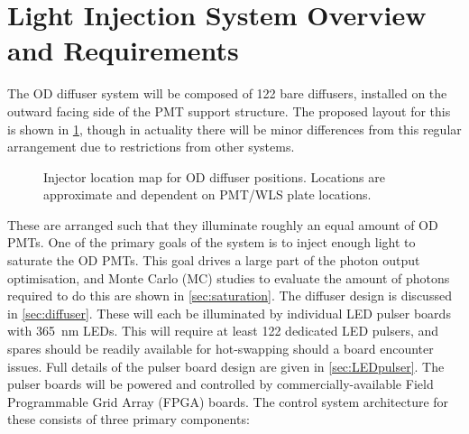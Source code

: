 \documentclass[a4paper,11pt]{article}
\begin{document}
\section{Light Injection System Overview and Requirements}

The OD diffuser system will be composed of 122 bare diffusers, installed on the outward facing side of the PMT support structure. The proposed layout for this is shown in \cref{fig:ODdiffmap}, though in actuality there will be minor differences from this regular arrangement due to restrictions from other systems.
\begin{figure}[h!]
\centering
{}
\caption{Injector location map for OD diffuser positions. Locations are approximate and dependent on PMT/WLS plate locations.}\label{fig:ODdiffmap}
\end{figure}
These are arranged such that they illuminate roughly an equal amount of OD PMTs. One of the primary goals of the system is to inject enough light to saturate the OD PMTs. This goal drives a large part of the photon output optimisation, and Monte Carlo (MC) studies to evaluate the amount of photons required to do this are shown in \cref{sec:saturation}. The diffuser design is discussed in \cref{sec:diffuser}. These will each be illuminated by individual LED pulser boards with 365~nm LEDs. This will require at least 122 dedicated LED pulsers, and spares should be readily available for hot-swapping should a board encounter issues. Full details of the pulser board design are given in \cref{sec:LEDpulser}. The pulser boards will be powered and controlled by commercially-available Field Programmable Grid Array (FPGA) boards. The control system architecture for these consists of three primary components:
\end{document}
